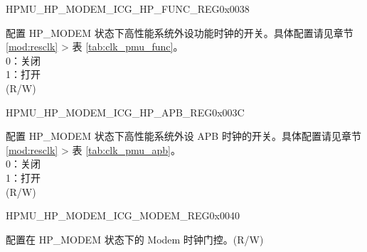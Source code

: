 \begin{register}{H}{PMU\_HP\_MODEM\_ICG\_HP\_FUNC\_REG}{0x0038}\label{regdesc:PMUHPMODEMICGHPFUNCREG}
%
\regnewline%
\begin{regdesc}\begin{reglist}
\label{fielddesc:PMUHPMODEMDIGICGFUNCEN}\item [PMU\_HP\_MODEM\_DIG\_ICG\_FUNC\_EN] 配置 HP\_MODEM 状态下高性能系统外设功能时钟的开关。具体配置请见章节 \ref{mod:resclk} \textit{} > 表 \ref{tab:clk_pmu_func}。\\
0：关闭\\
1：打开\\
(R/W)
\end{reglist}\end{regdesc}
\end{register}


\begin{register}{H}{PMU\_HP\_MODEM\_ICG\_HP\_APB\_REG}{0x003C}\label{regdesc:PMUHPMODEMICGHPAPBREG}
%
\regnewline%
\begin{regdesc}\begin{reglist}
\label{fielddesc:PMUHPMODEMDIGICGAPBEN}\item [PMU\_HP\_MODEM\_DIG\_ICG\_APB\_EN] 配置 HP\_MODEM 状态下高性能系统外设 APB 时钟的开关。具体配置请见章节 \ref{mod:resclk} \textit{} > 表 \ref{tab:clk_pmu_apb}。\\
0：关闭\\
1：打开\\
(R/W)
\end{reglist}\end{regdesc}
\end{register}


\begin{register}{H}{PMU\_HP\_MODEM\_ICG\_MODEM\_REG}{0x0040}\label{regdesc:PMUHPMODEMICGMODEMREG}
%
%
\regnewline%
\begin{regdesc}\begin{reglist}
\label{fielddesc:PMUHPMODEMDIGICGMODEMCODE}\item [PMU\_HP\_MODEM\_DIG\_ICG\_MODEM\_CODE] 配置在 HP\_MODEM 状态下的 Modem 时钟门控。(R/W)
\end{reglist}\end{regdesc}
\end{register}



